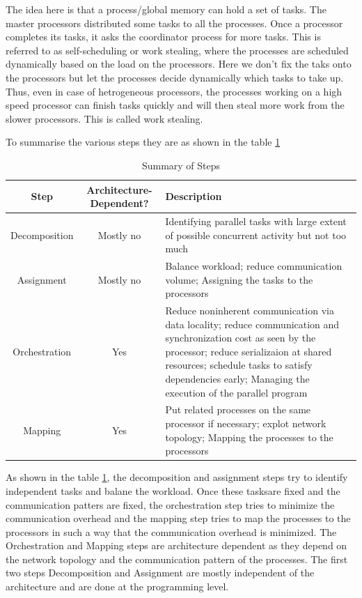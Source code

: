 \documentclass[12pt]{article}
\begin{document}
The idea here is that a process/global memory can hold a set of tasks. The master processors distributed some tasks to all the processes. Once a processor completes its tasks, it asks the coordinator process for more tasks.
This is referred to as self-scheduling or work stealing, where the processes are scheduled dynamically based on the load on the processors. Here we don't fix the taks onto the processors but let the processes decide dynamically which tasks to take up.
Thus, even in case of hetrogeneous processors, the processes working on a high speed processor can finish tasks quickly and will then steal more work from the slower processors. This is called work stealing.


To summarise the various steps they are as shown in the table \ref{tab:summary}
\begin{table}[H]
    \centering
    \begin{tabular}{|c|c|p{}|}
        \hline
        \textbf{Step} & Architecture-Dependent? &  \textbf{Description} \\
        \hline
        Decomposition & Mostly no &  Identifying parallel tasks with large extent of possible concurrent activity but not too much \\
        Assignment & Mostly no & Balance workload; reduce communication volume; Assigning the tasks to the processors \\
        Orchestration & Yes & Reduce noninherent communication via data locality; reduce communication and synchronization cost as seen by the processor; reduce serializaion at shared resources; schedule tasks to satisfy dependencies early;
        Managing the execution of the parallel program \\
        Mapping & Yes & Put related processes on the same processor if necessary; explot network topology; Mapping the processes to the processors \\
        \hline
    \end{tabular}
    \caption{Summary of Steps}
    \label{tab:summary}
\end{table}
As shown in the table \ref{tab:summary}, the decomposition and assignment steps try to identify independent tasks and balane the workload. Once these tasksare fixed and the communication patters are fixed,
the orchestration step tries to minimize the communication overhead and the mapping step tries to map the processes to the processors in such a way that the communication overhead is minimized. The Orchestration and Mapping steps are architecture dependent as they depend on the network topology and the communication pattern of the processes.
The first two steps Decomposition and Assignment are mostly independent of the architecture and are done at the programming level.
\end{document}
